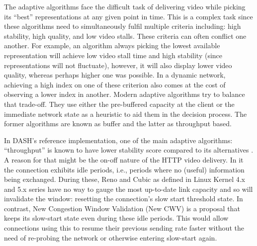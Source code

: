 \documentclass[10pt,sigconf]{acmart}
\begin{document}

The adaptive algorithms face the difficult task of delivering video while picking its ``best'' representations at any given point in time. This is a complex task since these algorithms need to simultaneously fulfil multiple criteria including: high stability, high quality, and low video stalls. These criteria can often conflict one another. For example, an algorithm always picking the lowest available representation will achieve low video stall time and high stability (since representations will not fluctuate), however, it will also display lower video quality, whereas perhaps higher one was possible. In a dynamic network, achieving a high index on one of these criterion also comes at the cost of observing a lower index in another. Modern adaptive algorithms try to balance that trade-off. They use either the pre-buffered capacity at the client or the immediate network state as a heuristic to aid them in the decision process. The former algorithms are known as buffer and the latter as throughput based. 

In DASH's reference implementation, one of the main adaptive algorithms: ``throughput'' is known to have lower stability score compared to its alternatives \cite{Spiteri-2016-BOLA}. A reason for that might be the on-off nature of the HTTP video delivery. In it the connection exhibits idle periods, i.e., periods where no (useful) information being exchanged. During these, Reno and Cubic as defined in Linux Kernel 4.x and 5.x series have no way to gauge the most up-to-date link capacity and so will invalidate the window: resetting the connection's slow start threshold state. In contrast, New Congestion Window Validation (New CWV) is a proposal that keeps its slow-start state even during these idle periods. This would allow connections using this to resume their previous sending rate faster without the need of re-probing the network or otherwise entering slow-start again.

\end{document}
